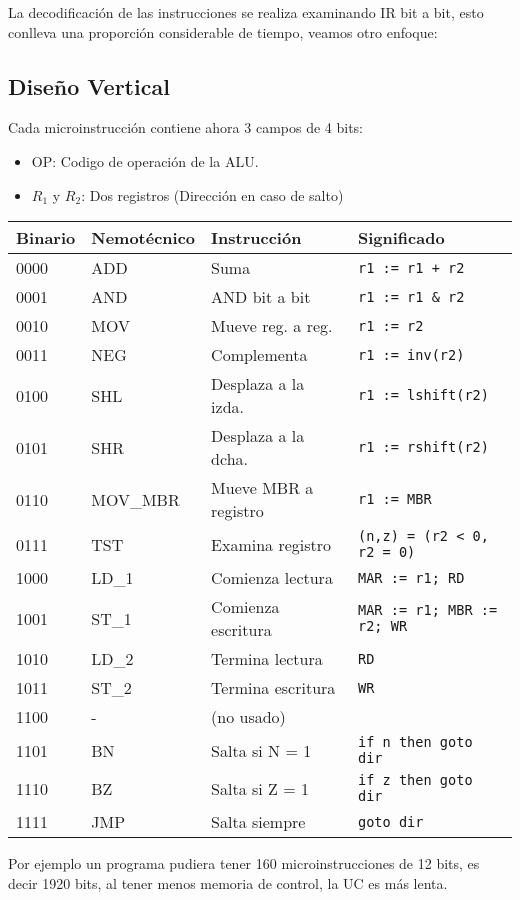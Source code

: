 La decodificación de las instrucciones se realiza examinando IR bit a bit, esto conlleva una proporción considerable de tiempo, veamos otro enfoque:
\subsection{Diseño Vertical}
Cada microinstrucción contiene ahora 3 campos de 4 bits:
\begin{itemize}
    \item OP: Codigo de operación de la ALU.
    \item $R_1$ y $R_2$: Dos registros (Dirección en caso de salto)
\end{itemize}

\begin{table}[ht!]
\centering
\setlength{\arrayrulewidth}{0.5mm}
\begin{tabular}{|l|l|l|l|}
\hline
\rowcolor[HTML]{D5E8D4} \textbf{Binario} & \textbf{Nemotécnico} & \textbf{Instrucción} & \textbf{Significado} \\
\hline
\rowcolor[HTML]{D5E8D4} 0000 & ADD & Suma & \texttt{r1 := r1 + r2} \\
\hline
\rowcolor[HTML]{D5E8D4} 0001 & AND & AND bit a bit & \texttt{r1 := r1 \& r2} \\
\hline
\rowcolor[HTML]{D5E8D4} 0010 & MOV & Mueve reg. a reg. & \texttt{r1 := r2} \\
\hline
\rowcolor[HTML]{D5E8D4} 0011 & NEG & Complementa & \texttt{r1 := inv(r2)} \\
\hline
\rowcolor[HTML]{D5E8D4} 0100 & SHL & Desplaza a la izda. & \texttt{r1 := lshift(r2)} \\
\hline
\rowcolor[HTML]{D5E8D4} 0101 & SHR & Desplaza a la dcha. & \texttt{r1 := rshift(r2)} \\
\hline
\rowcolor[HTML]{D5E8D4} 0110 & MOV\_MBR & Mueve MBR a registro & \texttt{r1 := MBR} \\
\hline
\rowcolor[HTML]{D5E8D4} 0111 & TST & Examina registro & \texttt{(n,z) = (r2 < 0, r2 = 0)} \\
\hline
\rowcolor[HTML]{D5E8D4} 1000 & LD\_1 & Comienza lectura & \texttt{MAR := r1; RD} \\
\hline
\rowcolor[HTML]{D5E8D4} 1001 & ST\_1 & Comienza escritura & \texttt{MAR := r1; MBR := r2; WR} \\
\hline
\rowcolor[HTML]{D5E8D4} 1010 & LD\_2 & Termina lectura & \texttt{RD} \\
\hline
\rowcolor[HTML]{D5E8D4} 1011 & ST\_2 & Termina escritura & \texttt{WR} \\
\hline
\rowcolor[HTML]{D5E8D4} 1100 & - & (no usado) &  \\
\hline
\rowcolor[HTML]{D5E8D4} 1101 & BN & Salta si N = 1 & \texttt{if n then goto dir} \\
\hline
\rowcolor[HTML]{D5E8D4} 1110 & BZ & Salta si Z = 1 & \texttt{if z then goto dir} \\
\hline
\rowcolor[HTML]{D5E8D4} 1111 & JMP & Salta siempre & \texttt{goto dir} \\
\hline
\end{tabular}
\end{table}
Por ejemplo un programa pudiera tener 160 microinstrucciones de 12 bits, es decir 1920 bits, al tener menos memoria de control, la UC es más lenta. 
